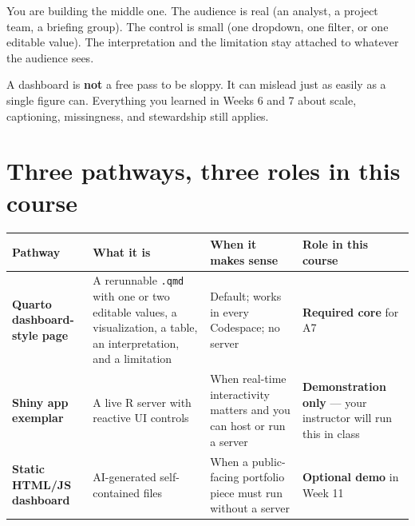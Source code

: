 \documentclass[
  letterpaper,
  DIV=11,
  numbers=noendperiod,
  oneside]{scrreprt}
\begin{document}
You are building the middle one. The audience is real (an analyst, a
project team, a briefing group). The control is small (one dropdown, one
filter, or one editable value). The interpretation and the limitation
stay attached to whatever the audience sees.

A dashboard is \textbf{not} a free pass to be sloppy. It can mislead
just as easily as a single figure can. Everything you learned in Weeks 6
and 7 about scale, captioning, missingness, and stewardship still
applies.

\section*{Three pathways, three roles in this
course}\label{three-pathways-three-roles-in-this-course}


\begin{longtable}[]{@{}
  >{\raggedright\arraybackslash}p{}
  >{\raggedright\arraybackslash}p{}
  >{\raggedright\arraybackslash}p{}
  >{\raggedright\arraybackslash}p{}@{}}
\toprule\noalign{}
\begin{minipage}[b]{\linewidth}\raggedright
Pathway
\end{minipage} & \begin{minipage}[b]{\linewidth}\raggedright
What it is
\end{minipage} & \begin{minipage}[b]{\linewidth}\raggedright
When it makes sense
\end{minipage} & \begin{minipage}[b]{\linewidth}\raggedright
Role in this course
\end{minipage} \\
\midrule\noalign{}
\endhead
\bottomrule\noalign{}
\endlastfoot
\textbf{Quarto dashboard-style page} & A rerunnable \texttt{.qmd} with
one or two editable values, a visualization, a table, an interpretation,
and a limitation & Default; works in every Codespace; no server &
\textbf{Required core} for A7 \\
\textbf{Shiny app exemplar} & A live R server with reactive UI controls
& When real-time interactivity matters and you can host or run a server
& \textbf{Demonstration only} --- your instructor will run this in
class \\
\textbf{Static HTML/JS dashboard} & AI-generated self-contained files &
When a public-facing portfolio piece must run without a server &
\textbf{Optional demo} in Week 11 \\
\end{longtable}
\end{document}
